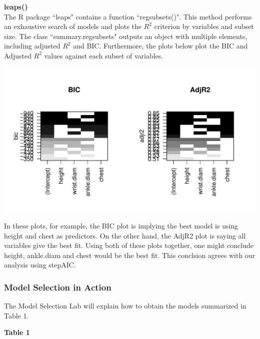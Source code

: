 \documentclass[11pt]{article}\usepackage[]{graphicx}\usepackage[]{color}
\makeatletter
\def\maxwidth{ %
  \ifdim\Gin@nat@width>\linewidth
    \linewidth
  \else
    \Gin@nat@width
  \fi
}
\newenvironment{knitrout}{}{} %
\makeatother
\begin{document}
\textbf{leaps()}\\

The R package ``leaps" contains a function ``regsubsets()". This method performs an exhaustive search of models and plots the $R^2$ criterion by variables and subset size. The class ``summary.regsubsets" outputs an object with multiple elements, including adjusted $R^2$ and BIC. Furthermore, the plots below plot the  
BIC and Adjusted $R^2$ values against each subset of variables. 

\begin{knitrout}
\color{fgcolor}
\includegraphics[width=\maxwidth]{figure/leap} 

\end{knitrout}


In these plots, for example, the BIC plot is implying the best model is using height and chest as predictors. On the other hand, the AdjR2 plot is saying all variables give the best fit. Using both of these plots together, one might conclude height, ankle.diam and chest would be the best fit. This conclsion agrees with our analysis using stepAIC.

\subsubsection{Model Selection in Action}




The Model Selection Lab will explain how to obtain the models summarized in Table 1.     

\textbf{Table 1}\\
\end{document}
